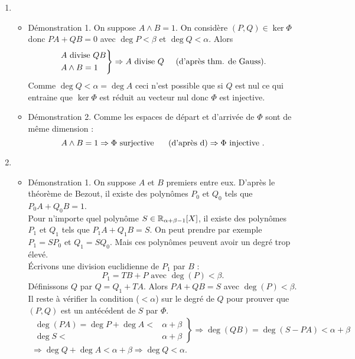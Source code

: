 \begin{enumerate}
\begin{enumerate}
\begin{itemize}
\end{itemize}
 \item \begin{itemize}
 \item Démonstration 1. On suppose $A\wedge B=1$. On considère $(P,Q)\in\ker \Phi$ donc $PA+QB=0$ avec $\deg P<\beta$ et $\deg Q <\alpha$. Alors
\begin{displaymath}
 \left. 
\begin{aligned}
 &A \text{ divise } QB \\
 &A\wedge B =1
\end{aligned}
\right\rbrace 
\Rightarrow A \text{ divise } Q \hspace{0.5cm}\text{(d'après thm. de Gauss)}.
\end{displaymath}
Comme $\deg Q <\alpha=\deg A$ ceci n'est possible que si $Q$ est nul ce qui entraine que $\ker \Phi$ est réduit au vecteur nul donc $\Phi$ est injective.
\item Démonstration 2. Comme les espaces de départ et d'arrivée de $\Phi$ sont de même dimension :
\begin{displaymath}
 A\wedge B =1 \Rightarrow \Phi \text{ surjective }  \hspace{0.5cm}\text{(d'après d)}
\Rightarrow \Phi \text{ injective }  .
\end{displaymath}
\end{itemize}
 \item \begin{itemize}
\item Démonstration 1. On suppose $A$ et $B$ premiers entre eux. D'après le théorème de Bezout, il existe des polynômes $P_0$ et $Q_0$ tels que $P_0A+Q_0B=1$.\\
Pour n'importe quel polynôme $S\in \mathbb{R}_{\alpha +\beta -1}[X]$, il existe des polynômes $P_1$ et $Q_1$ tels que $P_1A+Q_1B=S$. On peut prendre par exemple $P_1=SP_0$ et $Q_1=SQ_0$. Mais ces polynômes peuvent avoir un degré trop élevé.\\
\'Ecrivons une division euclidienne de $P_1$ par $B$ : 
\begin{displaymath}
 P_1 = TB +P \text{ avec } \deg(P)<\beta .
\end{displaymath}
Définissons $Q$ par $Q=Q_1+TA$. Alors $PA+QB=S$ avec $\deg(P)<\beta$.\\
Il reste à vérifier la condition ($<\alpha$) sur le degré de $Q$ pour prouver que $(P,Q)$ est un antécédent de $S$ par $\Phi$.
\begin{multline*}
 \left. 
\begin{aligned}
 \deg(PA)=\deg P +\deg A <&\alpha +\beta\\
 \deg S <&\alpha +\beta
\end{aligned}
\right\rbrace 
\Rightarrow \deg(QB)=\deg(S-PA)<\alpha + \beta \\
\Rightarrow \deg Q +\deg A<\alpha +\beta \Rightarrow\deg Q < \alpha .
\end{multline*}


\end{itemize}
\end{enumerate}
\end{enumerate}
